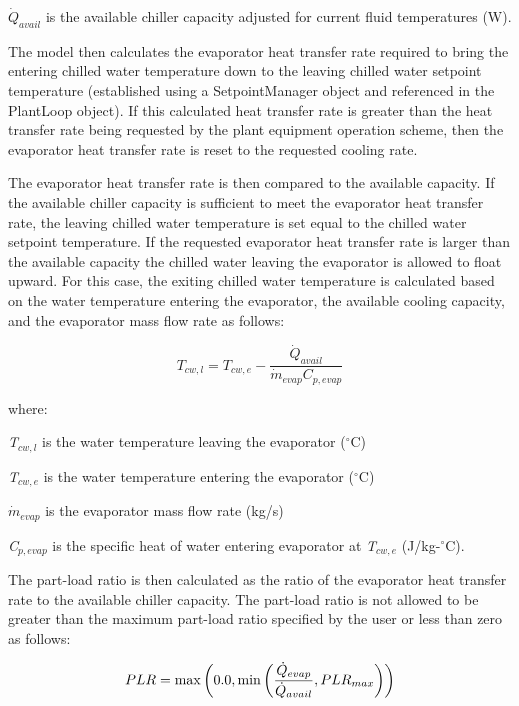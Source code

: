 \(\dot{Q}_{avail}\) is the available chiller capacity adjusted for current fluid temperatures (W).

The model then calculates the evaporator heat transfer rate required to bring the entering chilled water temperature down to the leaving chilled water setpoint temperature (established using a SetpointManager object and referenced in the PlantLoop object). If this calculated heat transfer rate is greater than the heat transfer rate being requested by the plant equipment operation scheme, then the evaporator heat transfer rate is reset to the requested cooling rate.

The evaporator heat transfer rate is then compared to the available capacity. If the available chiller capacity is sufficient to meet the evaporator heat transfer rate, the leaving chilled water temperature is set equal to the chilled water setpoint temperature. If the requested evaporator heat transfer rate is larger than the available capacity the chilled water leaving the evaporator is allowed to float upward. For this case, the exiting chilled water temperature is calculated based on the water temperature entering the evaporator, the available cooling capacity, and the evaporator mass flow rate as follows:

\begin{equation}
  T_{cw,l} = T_{cw,e} - \frac{\dot{Q}_{avail}}{\dot{m}_{evap}C_{p,evap}}
\end{equation}

where:

\emph{T\(_{cw,l}\)} is the water temperature leaving the evaporator (\(^{\circ}\)C)

\emph{T\(_{cw,e}\)} is the water temperature entering the evaporator (\(^{\circ}\)C)

\(\dot{m}_{evap}\) is the evaporator mass flow rate (kg/s)

\emph{C\(_{p,evap}\)} is the specific heat of water entering evaporator at \emph{T\(_{cw,e}\)} (J/kg-\(^{\circ}\)C).

The part-load ratio is then calculated as the ratio of the evaporator heat transfer rate to the available chiller capacity. The part-load ratio is not allowed to be greater than the maximum part-load ratio specified by the user or less than zero as follows:

\begin{equation}
  PLR = \max\left(0.0,\min\left(\frac{\dot{Q}_{evap}}{\dot{Q}_{avail}},PLR_{max}\right)\right)
\end{equation}

